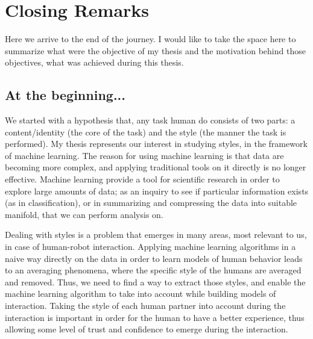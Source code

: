 \chapter{Closing Remarks} \label{ch:closing_remarks}
\minitoc%

\par Here we arrive to the end of the journey. I would like to take the space here to summarize what were the objective of my thesis and the motivation behind those objectives, what was achieved during this thesis.

\section{At the beginning...}

  \par We started with a hypothesis that, any task human do consists of two parts: a content/identity (the core of the task) and the style (the manner the task is performed). My thesis represents our interest in studying styles, in the framework of machine learning. The reason for using machine learning is that data are becoming more complex, and applying traditional tools on it directly is no longer effective. Machine learning provide a tool for scientific research in order to explore large amounts of data; as an inquiry to see if particular information exists (as in classification), or in summarizing and compressing the data into suitable manifold, that we can perform analysis on.

  \par Dealing with styles is a problem that emerges in many areas, most relevant to us, in case of human-robot interaction. Applying machine learning algorithms in a naive way directly on the data in order to learn models of human behavior leads to an averaging phenomena, where the specific style of the humans are averaged and removed. Thus, we need to find a way to extract those styles, and enable the machine learning algorithm to take into account while building models of interaction. Taking the style of each human partner into account during the interaction is important in order for the human to have a better experience, thus allowing some level of trust and confidence to emerge during the interaction.


